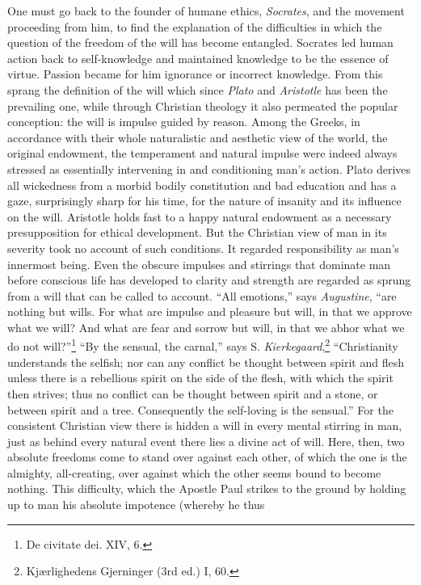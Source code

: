 \documentclass[12pt,a4paper,openany]{book}
\newcommand{\opage}[1]{\marginnote{\footnotesize\textit{[#1]}}}
\begin{document}
One must go back to the founder of humane ethics, \emph{Socrates}, and the
movement proceeding from him, to find the explanation of the
\opage{137}difficulties in which the question of the freedom of the will has
become entangled. Socrates led human action back to self-knowledge and
maintained knowledge to be the essence of virtue. Passion became for him
ignorance or incorrect knowledge. From this sprang the definition of the
will which since \emph{Plato} and \emph{Aristotle} has been the prevailing
one, while through Christian theology it also permeated the popular
conception: the will is impulse guided by reason. Among the Greeks, in
accordance with their whole naturalistic and aesthetic view of the world,
the original endowment, the temperament and natural impulse were indeed
always stressed as essentially intervening in and conditioning man's action.
Plato derives all wickedness from a morbid bodily constitution and bad
education and has a gaze, surprisingly sharp for his time, for the nature of
insanity and its influence on the will. Aristotle holds fast to a happy
natural endowment as a necessary presupposition for ethical development. But
the Christian view of man in its severity took no account of such
conditions. It regarded responsibility as man's innermost being. Even the
obscure impulses and stirrings that dominate man before conscious life has
developed to clarity and strength are regarded as sprung from a will that
can be called to account. ``All emotions,'' says \emph{Augustine}, ``are
nothing but wills. For what are impulse and pleasure but will, in that we
approve what we will? And what are fear and sorrow but will, in that
\opage{138}we abhor what we do not will?''\footnote[1]{De civitate dei. XIV,
6.} ``By the sensual, the carnal,'' says S.
\emph{Kierkegaard},\footnote[2]{Kjærlighedens Gjerninger (3rd ed.) I, 60.}
``Christianity understands the selfish; nor can any conflict be thought
between spirit and flesh unless there is a rebellious spirit on the side of
the flesh, with which the spirit then strives; thus no conflict can be
thought between spirit and a stone, or between spirit and a tree.
Consequently the self-loving is the sensual.'' For the consistent Christian
view there is hidden a will in every mental stirring in man, just as behind
every natural event there lies a divine act of will. Here, then, two
absolute freedoms come to stand over against each other, of which the one is
the almighty, all-creating, over against which the other seems bound to
become nothing. This difficulty, which the Apostle Paul strikes to the
ground by holding up to man his absolute impotence (whereby he thus
\end{document}
